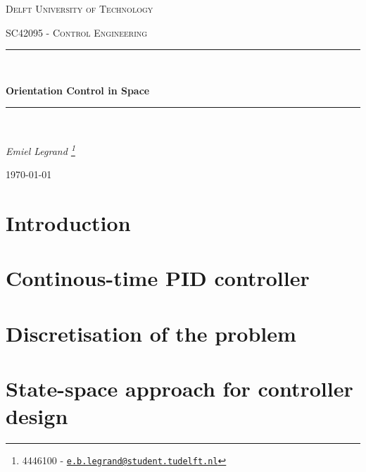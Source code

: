 \documentclass{article}
\date{\today}
\renewcommand*{\thefootnote}{\fnsymbol{footnote}}
\begin{document}
\begin{titlepage}
	\centering
	\vspace{2cm}
	{\scshape\large Delft University of Technology \par}
	\vspace{1cm}
	{\scshape\large SC42095 - Control Engineering\par}
	\vspace{3cm}
	\rule{\linewidth}{1.2pt}\\[0.5cm]
    {\huge\bfseries Orientation Control in Space\par}
	\vspace{0.5cm}
	\rule{\linewidth}{1.2pt}\\[0.5cm]
	\vspace{1.5cm}
	{\Large\itshape Emiel Legrand \footnote{4446100 -  \href{mailto:e.b.legrand@student.tudelft.nl}{\texttt{e.b.legrand@student.tudelft.nl}}} \par}
	\vfill

	{\large \today\par}
	\vfill
\end{titlepage}

\renewcommand*{\thefootnote}{\arabic{footnote}}
\setcounter{footnote}{0}

\clearpage
\renewcommand{\thepage}{\roman{page}}%

\setcounter{page}{1}
\tableofcontents
\clearpage

\renewcommand{\thepage}{\arabic{page}}%
\setcounter{page}{1}
\clearpage

\section{Introduction}


\section{Continous-time PID controller}


\section{Discretisation of the problem}


\section{State-space approach for controller design}

\end{document}
